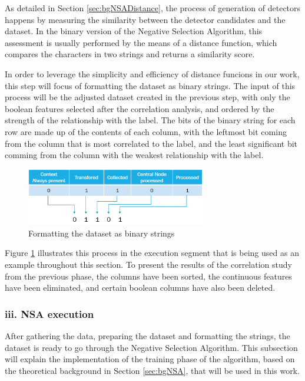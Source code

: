 As detailed in Section \ref{sec:bgNSADistance}, the process of generation of detectors happens by measuring the similarity between the detector candidates and the dataset. In the binary version of the Negative Selection Algorithm, this assessment is usually performed by the means of a distance function, which compares the characters in two strings and returns a similarity score. 

In order to leverage the simplicity and efficiency of distance funcions in our work, this step will focus of formatting the dataset as binary strings. The input of this process will be the adjusted dataset created in the previous step, with only the boolean features selected after the correlation analysis, and ordered by the strength of the relationship with the label. The bits of the binary string for each row are made up of the contents of each column, with the leftmost bit coming from the column that is most correlated to the label, and the least significant bit comming from the column with the weakest relationship with the label.

\begin{figure}[!h]
	\centering
	\includegraphics[width=0.7\textwidth, keepaspectratio]{img/stringFormatting.png}
	\caption{Formatting the dataset as binary strings}
	\label{fig:stringFormatting}
\end{figure}

Figure \ref{fig:stringFormatting} illustrates this process in the execution segment that is being used as an example throughout this section. To present the results of the correlation study from the previous phase, the columns have been sorted, the continuous features have been eliminated, and certain boolean columns have also been deleted.

\subsubsection{iii. NSA execution}

After gathering the data, preparing the dataset and formatting the strings, the dataset is ready to go through the Negative Selection Algorithm. This subsection will explain the implementation of the training phase of the algorithm, based on the theoretical background in Section \ref{sec:bgNSA}, that will be used in this work.

